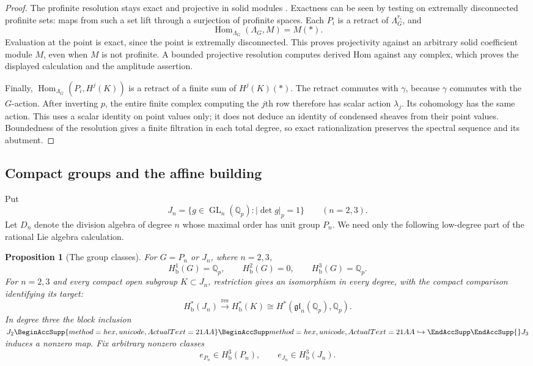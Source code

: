 \documentclass[11pt]{article}
\numberwithin{equation}{section}
\newtheorem{proposition}[theorem]{Proposition}
\theoremstyle{definition}
\theoremstyle{remark}
\newcommand{\Q}{\mathbb Q}
\DeclareMathOperator{\GL}{GL}
\DeclareMathOperator{\Hom}{Hom}
\let\UnicodeOriginalHookrightarrow\hookrightarrow
\DeclareRobustCommand{\hookrightarrow}{
  \BeginAccSupp{method=hex,unicode,ActualText=21AA}
  \UnicodeOriginalHookrightarrow\EndAccSupp{}}
\begin{document}
\begin{proof}
The profinite resolution stays exact and projective in solid
modules \cite[Theorems~3.2 and~3.14(i)]{Tang2026}.
Exactness can be seen by testing on extremally
disconnected profinite sets: maps from such a set lift through a
surjection of profinite spaces.  Each $P_i$ is a retract of
$\Lambda_G^{r_i}$, and
\[
 \Hom_{\Lambda_G}(\Lambda_G,M)=M(*).
\]
Evaluation at the point is exact, since the point is extremally
disconnected.  This proves projectivity against an arbitrary solid
coefficient module $M$, even when $M$ is not profinite.  A bounded
projective resolution computes derived Hom against any complex,
which proves the displayed calculation and the amplitude assertion.

Finally, $\Hom_{\Lambda_G}(P_i,H^j(K))$ is a retract of a finite
sum of $H^j(K)(*)$.  The retract commutes with $\gamma$, because
$\gamma$ commutes with the $G$-action.  After inverting $p$, the
entire finite complex computing the $j$th row therefore has scalar
action $\lambda_j$.  Its cohomology has the same action.
This uses a scalar identity on point values only; it does not
deduce an identity of condensed sheaves from their point values.
Boundedness of the resolution gives a finite filtration in each
total degree, so exact rationalization preserves the spectral
sequence and its abutment.
\end{proof}

\subsection{Compact groups and the affine building}

Put
\[
 J_n=\{g\in\GL_n(\Q_p):|\det g|_p=1\}\qquad(n=2,3).
\]
Let $D_n$ denote the division algebra of degree $n$ whose maximal
order has unit group $P_n$.  We need only the following low-degree
part of the rational Lie algebra calculation.

\begin{proposition}[The group classes]
\label{prop:group-classes}
For $G=P_n$ or $J_n$, where $n=2,3$,
\[
 H^1_{\mathrm b}(G)=\Q_p,
 \qquad H^2_{\mathrm b}(G)=0,
 \qquad H^3_{\mathrm b}(G)=\Q_p.
\]
For $n=2,3$ and every compact open subgroup $K\subset J_n$,
restriction gives an isomorphism in every degree, with the compact
comparison identifying its target:
\[
 H^*_{\mathrm b}(J_n)\xrightarrow{\mathrm{res}}H^*_{\mathrm b}(K)
 \cong H^*(\mathfrak{gl}_n(\Q_p),\Q_p).
\]
In degree three the block inclusion $J_2\hookrightarrow J_3$
induces a nonzero map.  Fix arbitrary nonzero classes
\[
 e_{P_n}\in H^3_{\mathrm b}(P_n),\qquad
 e_{J_n}\in H^3_{\mathrm b}(J_n).
\]
\end{proposition}
\end{document}
